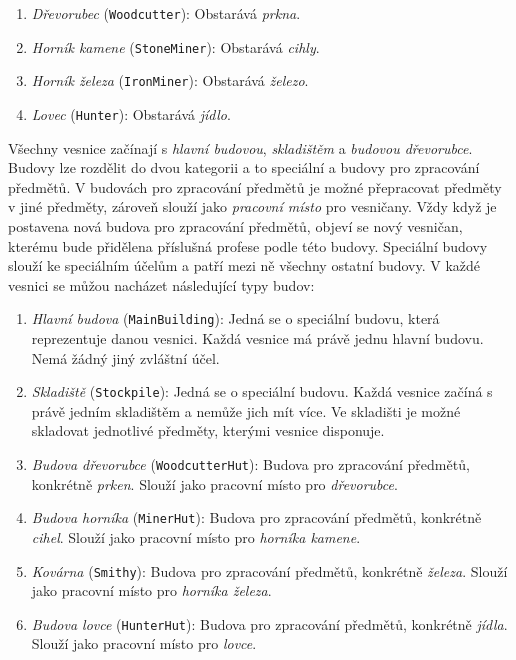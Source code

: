 \begin{enumerate}
    \item \textit{Dřevorubec} (\verb|Woodcutter|): Obstarává \textit{prkna}.
    \item \textit{Horník kamene} (\verb|StoneMiner|): Obstarává \textit{cihly}.
    \item \textit{Horník železa} (\verb|IronMiner|): Obstarává \textit{železo}.
    \item \textit{Lovec} (\verb|Hunter|): Obstarává \textit{jídlo}.
\end{enumerate}

Všechny vesnice začínají s \textit{hlavní budovou}, \textit{skladištěm} a \textit{budovou dřevorubce}. Budovy lze rozdělit do dvou kategorii a to speciální a budovy pro zpracování předmětů. V budovách pro zpracování předmětů je možné přepracovat předměty v jiné předměty, zároveň slouží jako \textit{pracovní místo} pro vesničany. Vždy když je postavena nová budova pro zpracování předmětů, objeví se nový vesničan, kterému bude přidělena příslušná profese podle této budovy. Speciální budovy slouží ke speciálním účelům a patří mezi ně všechny ostatní budovy. V každé vesnici se můžou nacházet následující typy budov:

\begin{enumerate}
    \item \textit{Hlavní budova} (\verb|MainBuilding|): Jedná se o speciální budovu, která reprezentuje danou vesnici. Každá vesnice má právě jednu hlavní budovu. Nemá žádný jiný zvláštní účel.
    \item \textit{Skladiště} (\verb|Stockpile|): Jedná se o speciální budovu. Každá vesnice začíná s právě jedním skladištěm a nemůže jich mít více. Ve skladišti je možné skladovat jednotlivé předměty, kterými vesnice disponuje.
    \item \textit{Budova dřevorubce} (\verb|WoodcutterHut|): Budova pro zpracování předmětů, konkrétně \textit{prken}. Slouží jako pracovní místo pro \textit{dřevorubce}.
    \item \textit{Budova horníka} (\verb|MinerHut|): Budova pro zpracování předmětů, konkrétně \textit{cihel}. Slouží jako pracovní místo pro \textit{horníka kamene}.
    \item \textit{Kovárna} (\verb|Smithy|): Budova pro zpracování předmětů, konkrétně \textit{železa}. Slouží jako pracovní místo pro \textit{horníka železa}.
    \item \textit{Budova lovce} (\verb|HunterHut|): Budova pro zpracování předmětů, konkrétně \textit{jídla}. Slouží jako pracovní místo pro \textit{lovce}.
\end{enumerate}
